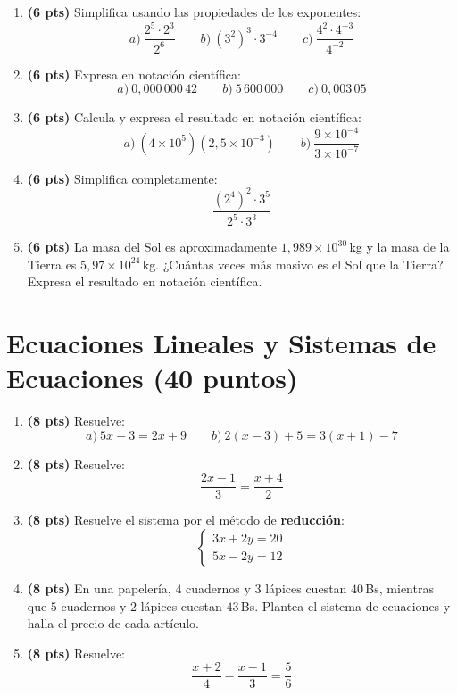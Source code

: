 \documentclass[12pt, letterpaper]{article}
\begin{document}
\begin{enumerate}[leftmargin=*]
  \item \textbf{(6 pts)} Simplifica usando las propiedades de los exponentes:
        \[
          a)\ \frac{2^5 \cdot 2^3}{2^6} \qquad b)\ (3^2)^3 \cdot 3^{-4} \qquad c)\ \frac{4^2 \cdot 4^{-3}}{4^{-2}}
        \]

  \item \textbf{(6 pts)} Expresa en notación científica:
        \[
          a)\ 0{,}000\,000\,42 \qquad b)\ 5\,600\,000 \qquad c)\ 0{,}003\,05
        \]

  \item \textbf{(6 pts)} Calcula y expresa el resultado en notación científica:
        \[
          a)\ (4 \times 10^5)(2{,}5 \times 10^{-3}) \qquad b)\ \frac{9 \times 10^{-4}}{3 \times 10^{-7}}
        \]

  \item \textbf{(6 pts)} Simplifica completamente:
        \[
          \frac{(2^4)^2 \cdot 3^5}{2^5 \cdot 3^3}
        \]

  \item \textbf{(6 pts)} La masa del Sol es aproximadamente $1{,}989 \times 10^{30}$\,kg y la masa de la Tierra es $5{,}97 \times 10^{24}$\,kg. ¿Cuántas veces más masivo es el Sol que la Tierra? Expresa el resultado en notación científica.
\end{enumerate}

\newpage

\section{Ecuaciones Lineales y Sistemas de Ecuaciones (40 puntos)}

\begin{enumerate}[leftmargin=*]
  \item \textbf{(8 pts)} Resuelve:
        \[
          a)\ 5x - 3 = 2x + 9 \qquad b)\ 2(x - 3) + 5 = 3(x + 1) - 7
        \]

  \item \textbf{(8 pts)} Resuelve:
        \[
          \frac{2x - 1}{3} = \frac{x + 4}{2}
        \]

  \item \textbf{(8 pts)} Resuelve el sistema por el método de \textbf{reducción}:
        \[
          \begin{cases} 3x + 2y = 20 \\ 5x - 2y = 12 \end{cases}
        \]

  \item \textbf{(8 pts)} En una papelería, $4$ cuadernos y $3$ lápices cuestan $40$\,Bs, mientras que $5$ cuadernos y $2$ lápices cuestan $43$\,Bs. Plantea el sistema de ecuaciones y halla el precio de cada artículo.

  \item \textbf{(8 pts)} Resuelve:
        \[
          \frac{x + 2}{4} - \frac{x - 1}{3} = \frac{5}{6}
        \]
\end{enumerate}
\end{document}
